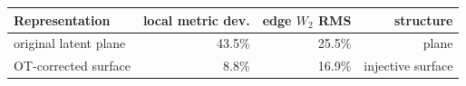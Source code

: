 \begin{tabular}{lrrr}
\toprule
Representation & local metric dev. & edge $W_2$ RMS & structure \\
\midrule
original latent plane & 43.5\% & 25.5\% & plane \\
OT-corrected surface & 8.8\% & 16.9\% & injective surface \\
\bottomrule
\end{tabular}
